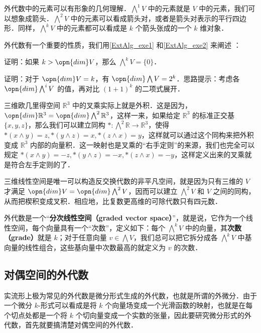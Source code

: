 外代数中的元素可以有形象的几何理解．$\bigwedge^1 V$ 中的元素就是 $V$ 中的元素，我们可以想象成箭头．$\bigwedge^2 V$ 中的元素可以看成箭头对，或者是箭头对表示的平行四边形．同样，$\bigwedge^k V$ 中的元素都可以看成是 $k$ 个箭头张成的一个 $k$ 维对象．

外代数有一个重要的性质，我们用\autoref{ExtAlg_exe1} 和\autoref{ExtAlg_exe2} 来阐述 ：

\begin{exercise}{}\label{ExtAlg_exe1}
证明：如果 $k>\opn{dim} V$，那么 $\bigwedge^kV=\{0\}$．
\end{exercise}

\begin{exercise}{}\label{ExtAlg_exe2}
证明：对于 $\opn{dim} V=k$，有 $\opn{dim} \bigwedge V=2^k$．思路提示：考虑各 $\opn{dim}\bigwedge^iV$ 的值，再对比 $(1+1)^k$ 的二项式展开．
\end{exercise}




三维欧几里得空间 $\mathbb{R}^3$ 中的叉乘实际上就是外积．这是因为，$\opn{dim}\mathbb{R}^3=\opn{dim}\bigwedge^2\mathbb{R}^3$，这样一来，如果给定 $\mathbb{R}^3$ 的标准正交基 $\{x, y, z\}$，那么我们可以建立同构 $*: \bigwedge^2\mathbb{R}\rightarrow\mathbb{R}^3$，使得 $*(x\wedge y)=z, *(y\wedge z)=x, *(z\wedge x)=y$，这样就可以通过这个同构来把外积变成 $\mathbb{R}^3$ 内部的向量积．这一映射也是叉乘的“右手定则”的来源，我们也完全可以规定 $*(x\wedge y)=-z, *(y\wedge z)=-x, *(z\wedge x)=-y$，这样定义出来的叉乘就是符合左手定则的了．

三维线性空间是唯一可以构造反交换代数的非平凡空间，就是因为只有三维的 $V$ 才满足 $\opn{dim}V=\opn{dim}\bigwedge^2V$，因而可以建立 $\bigwedge^2 V$ 和 $V$ 之间的同构，从而把楔积变成叉积．相应地，比复数更高维的可除代数只有四元数．

外代数是一个“\textbf{分次线性空间（graded vector space）}”，就是说，它作为一个线性空间，每个向量具有一个“次数”，定义如下：每个 $\bigwedge^kV$ 中的向量，其\textbf{次数（grade）}就是 $k$；对于任意向量 $v\in \bigwedge V$，我们总可以把它拆分成各 $\bigwedge^kV$ 中基向量的线性组合，这些基向量中次数最高的就定义为 $v$ 的次数．


\subsection{对偶空间的外代数}

实流形上极为常见的外代数是微分形式生成的外代数，也就是所谓的外微分．由于一个微分 $k$-形式可以看成是将 $k$ 个向量场变成一个光滑函数的映射，也就是在每个切点处都是一个将 $k$ 个切向量变成一个实数的张量，因此要研究微分形式的外代数，首先就要搞清楚对偶空间的外代数．

